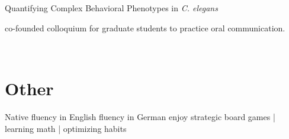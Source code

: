 \documentclass[]{winter-resume-openfont}
\begin{document}
\begin{minipage}[t]{0.65\textwidth}
\begin{tightemize}
\item {} Quantifying Complex Behavioral Phenotypes in \emph{C. elegans}

\item co-founded colloquium for graduate students to practice oral communication.
\end{tightemize}

\sectionsep

 \\
\sectionsep

\section{Other}
\sectionsep
Native fluency in English \textbullet{} fluency in German \textbullet{} enjoy strategic board games | learning math | optimizing habits




\end{minipage} 
\hfill
\end{document}

